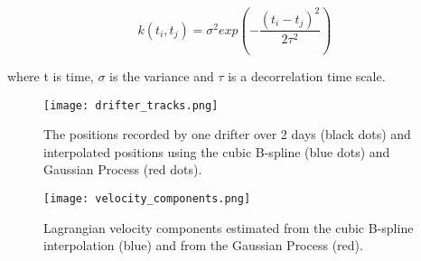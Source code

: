 \documentclass[12pt,a4paper]{article}%
\begin{document}
\begin{equation}
 k(t_i,t_j) = \sigma^2 exp(-\frac{(t_i-t_j)^2}{2\tau^2}) %
\end{equation}

where t is time, $\sigma$ is the variance and $\tau$ is a decorrelation time scale. %
 

\begin{figure}
\noindent\texttt{[image: drifter\_tracks.png]}
\caption{The positions recorded by one drifter over 2 days (black dots) and interpolated 
positions using the cubic B-spline (blue dots) and Gaussian Process (red dots).}
\label{fig-track}
\end{figure}

\begin{figure}
\noindent\texttt{[image: velocity\_components.png]}
\caption{Lagrangian velocity components estimated from the cubic B-spline interpolation (blue) 
and from the Gaussian Process (red).}
\label{fig-track}
\end{figure}
\end{document}
